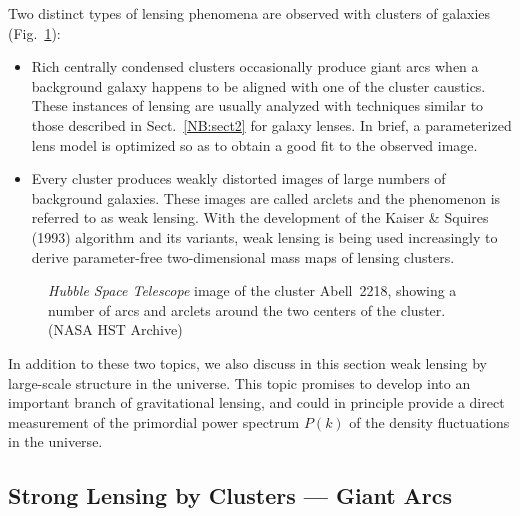 \documentclass[a4paper,10pt]{article} %
\begin{document}
Two distinct types of lensing phenomena are observed with clusters of
galaxies (Fig.\ \ref{NB:fig4.1}):

\begin{itemize}

\item[1] Rich centrally condensed clusters occasionally produce giant
arcs when a background galaxy happens to be aligned with one of the
cluster caustics. These instances of lensing are usually analyzed with
techniques similar to those described in Sect.\ \ref{NB:sect2} for
galaxy lenses. In brief, a parameterized lens model is optimized so as
to obtain a good fit to the observed image.

\item[2] Every cluster produces weakly distorted images of large
numbers of background galaxies. These images are called arclets and
the phenomenon is referred to as weak lensing. With the development of
the Kaiser \& Squires (1993) algorithm and its variants, weak lensing
is being used increasingly to derive parameter-free two-dimensional
mass maps of lensing clusters.

\end{itemize}

\begin{figure}[ht] %
\begin{center}
\begin{minipage}[t]{0.9\hsize}
\end{minipage}
\end{center}
\caption{{\em Hubble Space Telescope\/} image of the cluster
  Abell~2218, showing a number of arcs and arclets around the two
  centers of the cluster. (NASA HST Archive)}
\label{NB:fig4.1}
\end{figure}

In addition to these two topics, we also discuss in this section weak
lensing by large-scale structure in the universe. This topic promises
to develop into an important branch of gravitational lensing, and
could in principle provide a direct measurement of the primordial
power spectrum $P(k)$ of the density fluctuations in the universe.

\subsection{Strong Lensing by Clusters --- Giant Arcs}
\label{NB:subsect4.1}
\end{document}
